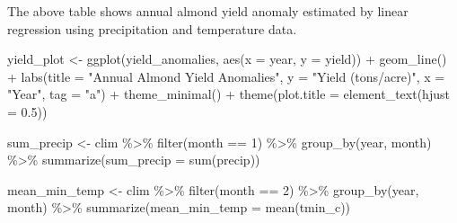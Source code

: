 \documentclass[
]{article}
\newenvironment{Shaded}{\begin{snugshade}}{\end{snugshade}}
\newcommand{\AttributeTok}[1]{\textcolor[rgb]{0.77,0.63,0.00}{#1}}
\newcommand{\DecValTok}[1]{\textcolor[rgb]{0.00,0.00,0.81}{#1}}
\newcommand{\FloatTok}[1]{\textcolor[rgb]{0.00,0.00,0.81}{#1}}
\newcommand{\FunctionTok}[1]{\textcolor[rgb]{0.00,0.00,0.00}{#1}}
\newcommand{\NormalTok}[1]{#1}
\newcommand{\OtherTok}[1]{\textcolor[rgb]{0.56,0.35,0.01}{#1}}
\newcommand{\SpecialCharTok}[1]{\textcolor[rgb]{0.00,0.00,0.00}{#1}}
\newcommand{\StringTok}[1]{\textcolor[rgb]{0.31,0.60,0.02}{#1}}
\begin{document}
The above table shows annual almond yield anomaly estimated by linear
regression using precipitation and temperature data.

\begin{Shaded}
\begin{Highlighting}[]
\NormalTok{yield\_plot }\OtherTok{\textless{}{-}} \FunctionTok{ggplot}\NormalTok{(yield\_anomalies, }\FunctionTok{aes}\NormalTok{(}\AttributeTok{x =}\NormalTok{ year, }\AttributeTok{y =}\NormalTok{ yield)) }\SpecialCharTok{+}
  \FunctionTok{geom\_line}\NormalTok{() }\SpecialCharTok{+}
  \FunctionTok{labs}\NormalTok{(}\AttributeTok{title =} \StringTok{"Annual Almond Yield Anomalies"}\NormalTok{, }\AttributeTok{y =} \StringTok{"Yield (tons/acre)"}\NormalTok{, }\AttributeTok{x =} \StringTok{"Year"}\NormalTok{, }\AttributeTok{tag =} \StringTok{"a"}\NormalTok{) }\SpecialCharTok{+}
  \FunctionTok{theme\_minimal}\NormalTok{() }\SpecialCharTok{+}
  \FunctionTok{theme}\NormalTok{(}\AttributeTok{plot.title =} \FunctionTok{element\_text}\NormalTok{(}\AttributeTok{hjust =} \FloatTok{0.5}\NormalTok{))}
\end{Highlighting}
\end{Shaded}

\begin{Shaded}
\begin{Highlighting}[]
\NormalTok{sum\_precip }\OtherTok{\textless{}{-}}\NormalTok{ clim }\SpecialCharTok{\%\textgreater{}\%} 
  \FunctionTok{filter}\NormalTok{(month }\SpecialCharTok{==} \DecValTok{1}\NormalTok{) }\SpecialCharTok{\%\textgreater{}\%} 
  \FunctionTok{group\_by}\NormalTok{(year, month) }\SpecialCharTok{\%\textgreater{}\%} 
  \FunctionTok{summarize}\NormalTok{(}\AttributeTok{sum\_precip =} \FunctionTok{sum}\NormalTok{(precip))}

\NormalTok{mean\_min\_temp }\OtherTok{\textless{}{-}}\NormalTok{ clim }\SpecialCharTok{\%\textgreater{}\%} 
  \FunctionTok{filter}\NormalTok{(month }\SpecialCharTok{==} \DecValTok{2}\NormalTok{) }\SpecialCharTok{\%\textgreater{}\%} 
  \FunctionTok{group\_by}\NormalTok{(year, month) }\SpecialCharTok{\%\textgreater{}\%} 
  \FunctionTok{summarize}\NormalTok{(}\AttributeTok{mean\_min\_temp =} \FunctionTok{mean}\NormalTok{(tmin\_c))}
\end{Highlighting}
\end{Shaded}
\end{document}
